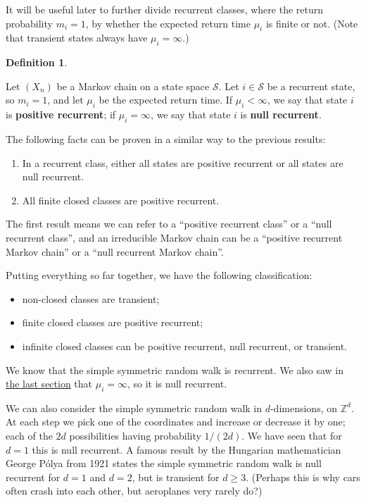 \documentclass[
  a4paper,
]{article}
\providecommand{\tightlist}{%
  \setlength{\itemsep}{0pt}\setlength{\parskip}{0pt}}
\theoremstyle{definition}
\newtheorem{definition}{Definition}[section]
\theoremstyle{definition}
\theoremstyle{definition}
\theoremstyle{remark}
\begin{document}
It will be useful later to further divide recurrent classes, where the return probability \(m_i = 1\), by whether the expected return time \(\mu_i\) is finite or not. (Note that transient states always have \(\mu_i = \infty\).)

\begin{definition}
\protect\hypertarget{def:unlabeled-div-9}{}\label{def:unlabeled-div-9}

Let \((X_n)\) be a Markov chain on a state space \(\mathcal S\). Let \(i \in \mathcal S\) be a recurrent state, so \(m_i = 1\), and let \(\mu_i\) be the expected return time.
If \(\mu_i < \infty\), we say that state \(i\) is \textbf{positive recurrent}; if \(\mu_i = \infty\), we say that state \(i\) is \textbf{null recurrent}.

\end{definition}

The following facts can be proven in a similar way to the previous results:

\begin{enumerate}
\def\labelenumi{\arabic{enumi}.}
\tightlist
\item
  In a recurrent class, either all states are positive recurrent or all states are null recurrent.
\item
  All finite closed classes are positive recurrent.
\end{enumerate}

The first result means we can refer to a ``positive recurrent class'' or a ``null recurrent class'', and an irreducible Markov chain can be a ``positive recurrent Markov chain'' or a ``null recurrent Markov chain''.

Putting everything so far together, we have the following classification:

\begin{itemize}
\tightlist
\item
  non-closed classes are transient;
\item
  finite closed classes are positive recurrent;
\item
  infinite closed classes can be positive recurrent, null recurrent, or transient.
\end{itemize}

We know that the simple symmetric random walk is recurrent. We also saw in \protect\hyperlink{S08-return-rw}{the last section} that \(\mu_i = \infty\), so it is null recurrent.

We can also consider the simple symmetric random walk in \(d\)-dimensions, on \(\mathbb Z^d\). At each step we pick one of the coordinates and increase or decrease it by one; each of the \(2d\) possibilities having probability \(1/(2d)\). We have seen that for \(d=1\) this is null recurrent. A famous result by the Hungarian mathematician George Pólya from 1921 states the simple symmetric random walk is null recurrent for \(d = 1\) and \(d = 2\), but is transient for \(d \geq 3\). (Perhaps this is why cars often crash into each other, but aeroplanes very rarely do?)
\end{document}
